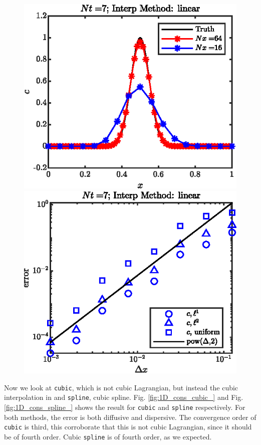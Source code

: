 \documentclass[11pt,letterpaper]{article}
\begin{document}
\begin{figure}[H]
    \centering
    \includegraphics{figs/1D_cons_linear_sol}
    \includegraphics{figs/1D_cons_linear_convord}
    \caption{}\label{fig:1D_cons_linear_}
\end{figure}
Now we look at \texttt{cubic}, which is not cubic Lagrangian, but instead the cubic interpolation in \cite{keys_cubic_1981} and \texttt{spline}, cubic spline. Fig. \ref{fig:1D_cons_cubic_} and Fig. \ref{fig:1D_cons_spline_} shows the result for \texttt{cubic} and \texttt{spline} respectively. For both methods, the error is both diffusive and dispersive. The convergence order of \texttt{cubic} is third, this corroborate that this is not cubic Lagrangian, since it should be of fourth order. Cubic \texttt{spline} is of fourth order, as we expected.
\end{document}

